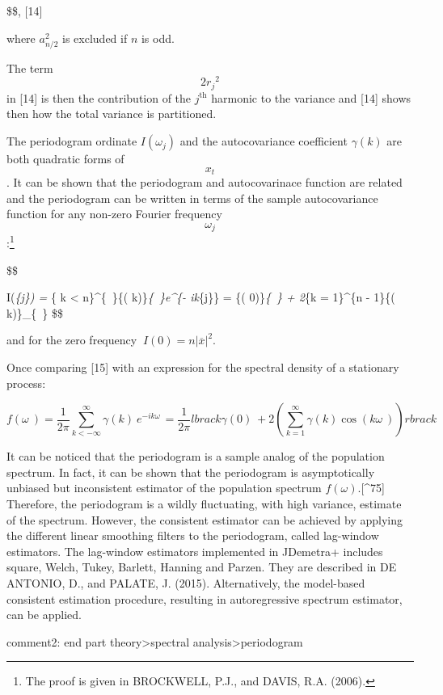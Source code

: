 \documentclass[
  letterpaper,
  DIV=11,
  numbers=noendperiod]{scrreprt}
\begin{document}
\$\$, {[}14{]}

where \(a_{n/2}^{2}\) is excluded if \(n\) is odd.

The term \[2{r_{j}}^{2}\] in {[}14{]} is then the contribution of the
\(j^{\text{th}}\) harmonic to the variance and {[}14{]} shows then how
the total variance is partitioned.

The periodogram ordinate \(I(\omega_{j})\) and the autocovariance
coefficient \(\gamma(k)\) are both quadratic forms of \[x_{t}\]. It can
be shown that the periodogram and autocovarinace function are related
and the periodogram can be written in terms of the sample autocovariance
function for any non-zero Fourier frequency \[ω_{j}\] :\footnote{The
  proof is given in BROCKWELL, P.J., and DAVIS, R.A. (2006).}

\$\$

I(\omega\emph{\{j\}) = \sum}\{\textbar{} k \textbar{} \textless{}
n\}\^{}\{~\}\{\widehat{\gamma}( k)\}\emph{\{~\}e\^{}\{- ik\omega}\{j\}\}
= \{\widehat{\gamma}( 0)\}\emph{\{~\} + 2\sum}\{k = 1\}\^{}\{n -
1\}\{\widehat{\gamma}( k)\}\_\{~\} \$\$

and for the zero frequency \(\ I( 0) = n| \overline{x} |^{2}\).

Once comparing {[}15{]} with an expression for the spectral density of a
stationary process:

\[
f(\omega_{\ }) = \frac{1}{2\pi}\sum_{k < - \infty}^{\infty}{\gamma( k)}_{\ }e^{- ik\omega_{\ }} = \frac{1}{2\pi}lbrack {\gamma( 0)}_{\ } + 2(\sum_{k = 1}^{\infty}{\gamma( k)\cos{(k\omega_{\ })}}) rbrack
\]

It can be noticed that the periodogram is a sample analog of the
population spectrum. In fact, it can be shown that the periodogram is
asymptotically unbiased but inconsistent estimator of the population
spectrum \(f(\omega)\).{[}\^{}75{]} Therefore, the periodogram is a
wildly fluctuating, with high variance, estimate of the spectrum.
However, the consistent estimator can be achieved by applying the
different linear smoothing filters to the periodogram, called lag-window
estimators. The lag-window estimators implemented in JDemetra+ includes
square, Welch, Tukey, Barlett, Hanning and Parzen. They are described in
DE ANTONIO, D., and PALATE, J. (2015). Alternatively, the model-based
consistent estimation procedure, resulting in autoregressive spectrum
estimator, can be applied.

comment2: end part theory\textgreater spectral
analysis\textgreater periodogram
\end{document}
